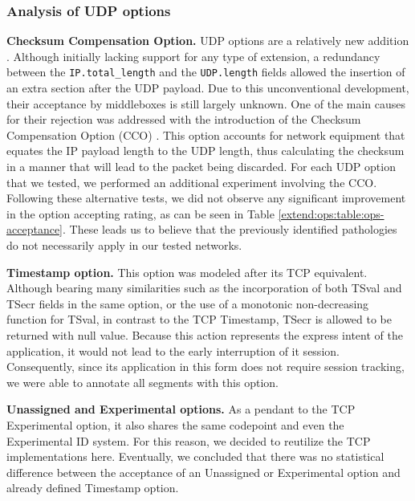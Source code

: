 \subsubsection{Analysis of UDP options}
\label{extend:ops:evaluation:udp-ops}

\textbf{Checksum Compensation Option.} UDP options are a relatively new addition \cite{I-D.ietf-tsvwg-udp-options}. Although initially lacking support for any type of extension, a redundancy between the \texttt{IP.total\_length} and the \texttt{UDP.length} fields allowed the insertion of an extra section after the UDP payload. Due to this unconventional development, their acceptance by middleboxes is still largely unknown. One of the main causes for their rejection \cite{zullo2020overcoming} was addressed with the introduction of the Checksum Compensation Option (CCO) \cite{I-D.fairhurst-udp-options-cco}. This option accounts for network equipment that equates the IP payload length to the UDP length, thus calculating the checksum in a manner that will lead to the packet being discarded. For each UDP option that we tested, we performed an additional experiment involving the CCO. Following these alternative tests, we did not observe any significant improvement in the option accepting rating, as can be seen in Table \ref{extend:ops:table:ops-acceptance}. These leads us to believe that the previously identified pathologies do not necessarily apply in our tested networks.

\textbf{Timestamp option.} This option was modeled after its TCP equivalent. Although bearing many similarities such as the incorporation of both TSval and TSecr fields in the same option, or the use of a monotonic non-decreasing function for TSval, in contrast to the TCP Timestamp, TSecr is allowed to be returned with null value. Because this action represents the express intent of the application, it would not lead to the early interruption of it session. Consequently, since its application in this form does not require session tracking, we were able to annotate all segments with this option.

\textbf{Unassigned and Experimental options.} As a pendant to the TCP Experimental option, it also shares the same codepoint and even the Experimental ID system. For this reason, we decided to reutilize the TCP implementations here. Eventually, we concluded that there was no statistical difference between the acceptance of an Unassigned or Experimental option and already defined Timestamp option.



